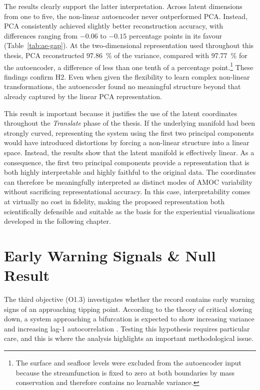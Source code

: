 The results clearly support the latter interpretation. Across latent dimensions from one to five, the non-linear autoencoder never outperformed PCA. Instead, PCA consistently achieved slightly better reconstruction accuracy, with differences ranging from $-0.06$ to $-0.15$ percentage points in its favour (Table~\ref{tab:ae-gap}). At the two-dimensional representation used throughout this thesis, PCA reconstructed \SI{97.86}{\percent} of the variance, compared with \SI{97.77}{\percent} for the autoencoder, a difference of less than one tenth of a percentage point.\footnote{The surface and seafloor levels were excluded from the autoencoder input because the streamfunction is fixed to zero at both boundaries by mass conservation and therefore contains no learnable variance.} These findings confirm H2. Even when given the flexibility to learn complex non-linear transformations, the autoencoder found no meaningful structure beyond that already captured by the linear PCA representation.




This result is important because it justifies the use of the latent coordinates throughout the \emph{Translate} phase of the thesis. If the underlying manifold had been strongly curved, representing the system using the first two principal components would have introduced distortions by forcing a non-linear structure into a linear space. Instead, the results show that the latent manifold is effectively linear. As a consequence, the first two principal components provide a representation that is both highly interpretable and highly faithful to the original data. The coordinates can therefore be meaningfully interpreted as distinct modes of AMOC variability without sacrificing representational accuracy. In this case, interpretability comes at virtually no cost in fidelity, making the proposed representation both scientifically defensible and suitable as the basis for the experiential visualisations developed in the following chapter.

\section{Early Warning Signals \& Null Result}
\label{sec:detect-ews}
 
The third objective (O1.3) investigates whether the record contains early warning signs of an approaching tipping point. According to the theory of critical slowing down, a system approaching a bifurcation is expected to show increasing variance and increasing lag-1 autocorrelation \citep{dakos2012, scheffer2009}. Testing this hypothesis requires particular care, and this is where the analysis highlights an important methodological issue.

